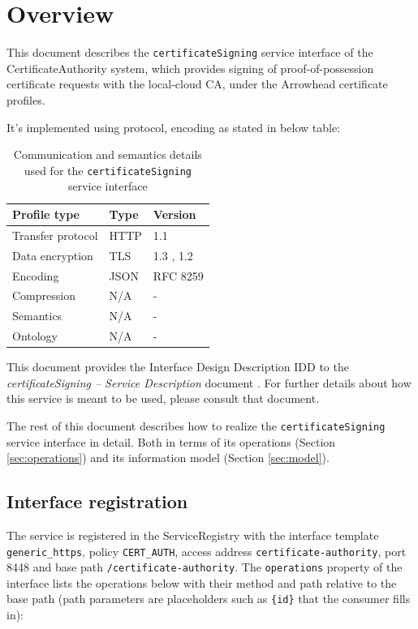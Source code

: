 \documentclass[a4paper]{arrowhead}
\begin{document}
\section{Overview}
\label{sec:overview}

This document describes the \texttt{certificateSigning} service interface of the CertificateAuthority system, which provides signing of proof-of-possession certificate requests with the local-cloud CA, under the Arrowhead certificate profiles.

It's implemented using protocol, encoding as stated in below table:
\begin{table}[ht!]
  \centering
  \begin{tabular}{|l|l|l|}
    \hline
    \rowcolor{gray!33} Profile type & Type & Version \\ \hline
    Transfer protocol & HTTP & 1.1 \cite{rfc9112} \\ \hline
    Data encryption & TLS & 1.3 \cite{rfc8446}, 1.2 \cite{rfc5246} \\ \hline
    Encoding & JSON & RFC 8259 \cite{rfc8259} \\ \hline
    Compression & N/A & - \\ \hline
    Semantics & N/A & - \\ \hline
    Ontology & N/A & - \\ \hline
  \end{tabular}
  \caption{Communication and semantics details used for the \texttt{certificateSigning} service interface}
  \label{tab:comunication_semantics_profile}
\end{table}

This document provides the Interface Design Description IDD to the \textit{certificateSigning -- Service Description} document \cite{cau-certificateSigning-sd}.
For further details about how this service is meant to be used, please consult that document.

The rest of this document describes how to realize the \texttt{certificateSigning} service
interface in detail. Both in terms of its operations (Section \ref{sec:operations}) and its information model (Section \ref{sec:model}).

\subsection{Interface registration}

The service is registered in the ServiceRegistry with the interface template \texttt{generic\_\allowbreak{}https}, policy \texttt{CERT\_\allowbreak{}AUTH}, access address \texttt{certificate-\allowbreak{}authority}, port 8448 and base path \texttt{/\allowbreak{}certificate-\allowbreak{}authority}. The \texttt{operations} property of the interface lists the operations below with their method and path relative to the base path (path parameters are placeholders such as \texttt{\{id\}} that the consumer fills in):
\end{document}
